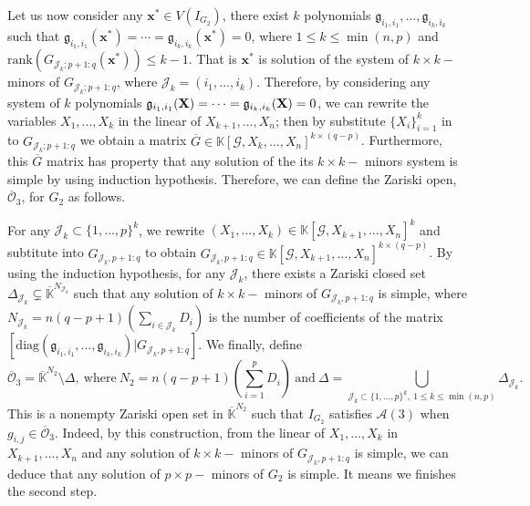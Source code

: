 \documentclass[11pt]{article}
\numberwithin{Property}{section}
\numberwithin{Theorem}{section}
\numberwithin{Proposition}{section}
\numberwithin{Lemma}{section}
\numberwithin{Corollary}{section}
\numberwithin{Definition}{section}
\numberwithin{Remark}{section}
\numberwithin{Conjecture}{section}
\numberwithin{Problem}{section}
\numberwithin{Claim}{section}
\theoremstyle{definition}
\numberwithin{Example}{section}
\renewcommand{\leq}{\leqslant}
\def\bar{\overline}
\newcommand{\field}{\mathbb{K}} %
\newcommand{\mat}[1]{\mathbf{\MakeUppercase{#1}}} %
\begin{document}
Let us now consider any $\mathbf{x}^* \in V(I_{G_2})$, there exist $k$ polynomials $\mathfrak{g}_{i_1,i_1}, \ldots, \mathfrak{g}_{i_k,i_k}$ such that $\mathfrak{g}_{i_1,i_1}(\mathbf{x}^*) = \cdots = \mathfrak{g}_{i_k,i_k}(\mathbf{x}^*) = 0$, where $1 \leq k \leq \min(n,p)$ and $\mathrm{rank}(G_{\mathcal{J}_k; p+1:q}(\mathbf{x}^*)) \leq k-1$. That is $\mathbf{x}^*$ is solution of the system of $k \times k -$ minors of $G_{\mathcal{J}_k; p+1:q}$, where $\mathcal{J}_k = (i_1, \ldots, i_k)$. Therefore, by considering any system of $k$ polynomials $\mathfrak{g}_{i_1,i_1}(\mat{X}) = \cdots = \mathfrak{g}_{i_k,i_k}(\mat{X}) = 0$, we can rewrite the variables $X_1, \ldots, X_k$ in the linear of $X_{k+1}, \ldots, X_n$; then by substitute $\{X_i\}_{i=1}^{k}$ in to $G_{\mathcal{J}_k; p+1:q}$ we obtain a matrix $\bar{G} \in \field[\mathcal{G}, X_k, \ldots, X_n]^{k \times (q-p)}$. Furthermore, this $\bar{G}$ matrix has property that any solution of the its $k \times k -$ minors system is simple by using induction hypothesis. Therefore, we can define the Zariski open, $\bar{\mathcal{O}}_3$, for $G_2$ as follows. 

For any $\mathcal{J}_k \subset \{1, \ldots, p\}^k$, we rewrite $(X_1, \ldots, X_k) \in \field[\mathcal{G}, X_{k+1}, \ldots, X_n]^{k}$ and subtitute into $G_{\mathcal{J}_k, p+1:q}$ to obtain $G_{\mathcal{J}_k, p+1:q} \in \field[\mathcal{G}, X_{k+1}, \ldots, X_n]^{k \times {(q-p)}}$. By using the induction hypothesis, for any $\mathcal{J}_k$, there exists a Zariski closed set $\Delta_{\mathcal{J}_k} \subsetneq \bar{\field}^{N_{\mathcal{J}_k}}$ such that any solution of $k \times k -$ minors of $G_{\mathcal{J}_k, p+1:q}$ is simple, where $N_{\mathcal{J}_k} = n(q-p+1)(\sum_{i \in \mathcal{J}_k}D_i)$ is the number of coefficients of the matrix $[\mathrm{diag}(\mathfrak{g}_{i_1, i_1}, \ldots, \mathfrak{g}_{i_k, i_k})|G_{\mathcal{J}_k, p+1:q}]$. We finally, define \[\bar{\mathcal{O}}_3 = \bar{\field}^{N_2} \setminus \Delta, \ \mathrm{where}\  N_2 = n(q-p+1)(\sum_{i=1}^pD_i) \ \mathrm{and} \ \Delta = \bigcup_{\mathcal{J}_k \subset\{1, \ldots, p\}^k, \ 1 \leq k \leq \min(n,p)}\Delta_{\mathcal{J}_k}.\]
This is a nonempty Zariski open set in $\bar{\field}^{N_2}$ such that $I_{G_2}$ satisfies $\mathcal{A}(3)$ when $g_{i,j} \in \bar{\mathcal{O}}_3$. Indeed, by this construction, from the linear of $X_1, \ldots, X_k$ in $X_{k+1}, \ldots, X_n$ and any solution of $k \times k -$ minors of $G_{\mathcal{J}_k, p+1:q}$ is simple, we can deduce that any solution of $p \times p -$ minors of $G_2$ is simple. It means we finishes the second step.
\end{document}
